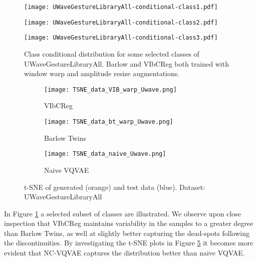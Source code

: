 \documentclass[../../thesis.tex]{subfiles}
\begin{document}
\begin{figure}[h]
    \centering
    \begin{minipage}[b]{0.32\textwidth}
        \centering
        \texttt{[image: UWaveGestureLibraryAll-conditional-class1.pdf]}
    \end{minipage}
    \begin{minipage}[b]{0.32\textwidth}
        \centering
        \texttt{[image: UWaveGestureLibraryAll-conditional-class2.pdf]}
    \end{minipage}
    \begin{minipage}[b]{0.32\textwidth}
        \centering
        \texttt{[image: UWaveGestureLibraryAll-conditional-class3.pdf]}
    \end{minipage}
    \caption{Class conditional distribution for some selected classes of UWaveGestureLibraryAll. Barlow and VIbCReg both trained with window warp and amplitude resize augmentations.}
    \label{fig:Warp_Uwave}
\end{figure}

\begin{figure}[h]
    \centering

    \begin{subfigure}[b]{0.29\textwidth}
        \texttt{[image: TSNE\_data\_VIB\_warp\_Uwave.png]}
        \caption{VIbCReg}
        \label{fig:TSNE_VIB_UWave}
    \end{subfigure}
    \begin{subfigure}[b]{0.29\textwidth}
        \texttt{[image: TSNE\_data\_bt\_warp\_Uwave.png]}
        \caption{Barlow Twins}
        \label{fig:TSNE_BT_UWave}
    \end{subfigure}
    \begin{subfigure}[b]{0.29\textwidth}
        \texttt{[image: TSNE\_data\_naive\_Uwave.png]}
        \caption{Naive VQVAE}
        \label{fig:TSNE_Naive_UWave}
    \end{subfigure}

    \caption{t-SNE of generated (orange) and test data (blue). Dataset: UWaveGestureLibraryAll}
    \label{fig:TSNE_Warp_Uwave}
\end{figure}

In Figure \ref{fig:Warp_Uwave} a selected subset of classes are illustrated. We observe upon close inspection that VIbCReg maintains variability in the samples to a greater degree than Barlow Twins, as well at slightly better capturing the dead-spots following the discontinuities. By investigating the t-SNE plots in Figure \ref{fig:TSNE_Warp_Uwave} it becomes more evident that NC-VQVAE captures the distribution better than naive VQVAE.
\end{document}
